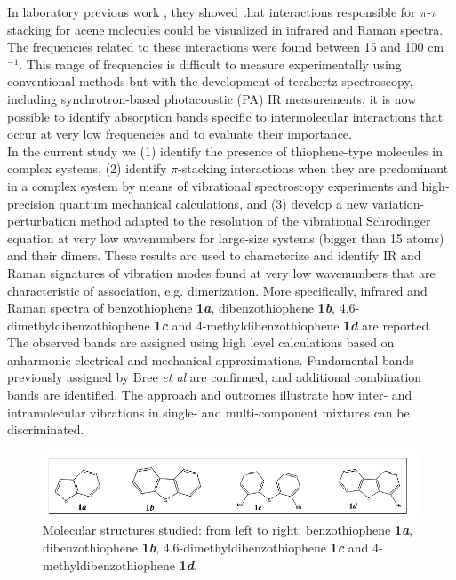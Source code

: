 	In laboratory previous work \cite{spillebout2014discerning}, they showed that interactions responsible for $\pi$-$\pi$ stacking for acene molecules could be visualized in infrared and Raman spectra. The frequencies related to these interactions were found between 15 and 100 cm$^{-1}$. This range of frequencies is difficult to measure experimentally using conventional methods but with the development of terahertz spectroscopy, including synchrotron-based photacoustic (PA) IR measurements, it is now possible to identify absorption bands specific to intermolecular interactions that occur at very low frequencies and to evaluate their importance.\\
	
	In the current study we (1) identify the presence of thiophene-type molecules in complex systems, (2) identify $\pi$-stacking interactions when they are predominant in a complex system by means of vibrational spectroscopy experiments and high-precision quantum mechanical calculations, and (3) develop a new variation-perturbation method adapted to the resolution of the vibrational Schrödinger equation at very low wavenumbers for large-size systems (bigger than 15 atoms) and their dimers. These results are used to characterize and identify IR and Raman signatures of vibration modes found at very low wavenumbers that are characteristic of association, e.g. dimerization. More specifically, infrared and Raman spectra of benzothiophene \textbf{1\textit{a}}, dibenzothiophene \textbf{1\textit{b}}, 4.6-dimethyldibenzothiophene \textbf{1\textit{c}} and 4-methyldibenzothiophene \textbf{1\textit{d}} are reported. The observed bands are assigned using high level calculations based on anharmonic electrical and mechanical approximations. Fundamental bands previously assigned by Bree \textit{et al} \cite{bree1971vibrations} are confirmed, and additional combination bands are identified. The approach and outcomes illustrate how inter- and intramolecular vibrations in single- and multi-component mixtures can be discriminated.
	
	\begin{figure}[H]
		\centering
		\includegraphics[scale=0.7]{image/image/P1-F1}
		\caption{Molecular structures studied:  from left to right: benzothiophene \textbf{1\textit{a}}, dibenzothiophene \textbf{1\textit{b}}, 4.6-dimethyldibenzothiophene \textbf{1\textit{c}} and 4-methyldibenzothiophene \textbf{1\textit{d}}.}
	\end{figure}
	
